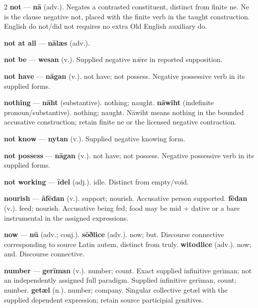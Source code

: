 \begin{multicols}{2}
\textbf{not} — \textbf{nā} (adv.). Negates a contrasted constituent, distinct from finite ne. Ne is the clause negative not, placed with the finite verb in the taught construction. English do not/did not requires no extra Old English auxiliary do.\par
\textbf{not at all} — \textbf{nālæs} (adv.).\par
\textbf{not be} — \textbf{wesan} (v.). Supplied negative nǣre in reported supposition.\par
\textbf{not have} — \textbf{nāgan} (v.). not have; not possess. Negative possessive verb in its supplied forms.\par
\textbf{nothing} — \textbf{nāht} (substantive). nothing; naught. \textbf{nāwiht} (indefinite pronoun/substantive). nothing; naught. Nāwiht means nothing in the bounded accusative construction; retain finite ne or the licensed negative contraction.\par
\textbf{not know} — \textbf{nytan} (v.). Supplied negative knowing form.\par
\textbf{not possess} — \textbf{nāgan} (v.). not have; not possess. Negative possessive verb in its supplied forms.\par
\textbf{not working} — \textbf{īdel} (adj.). idle. Distinct from empty/void.\par
\textbf{nourish} — \textbf{āfēdan} (v.). support; nourish. Accusative person supported. \textbf{fēdan} (v.). feed; nourish. Accusative being fed; food may be mid + dative or a bare instrumental in the assigned expressions.\par
\textbf{now} — \textbf{nū} (adv.; conj.).  \textbf{sōðlice} (adv.). now; but. Discourse connective corresponding to source Latin autem, distinct from truly. \textbf{witodlice} (adv.). now; and. Discourse connective.\par
\textbf{number} — \textbf{gerīman} (v.). number; count. Exact supplied infinitive gerīman; not an independently assigned full paradigm. Supplied infinitive gerīman, count; number. \textbf{getæl} (n.). number; company. Singular collective getæl with the supplied dependent expression; retain source participial genitives.\par

\end{multicols}

